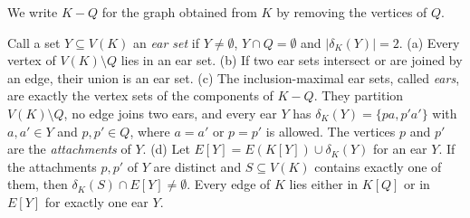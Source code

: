 We write $K - Q$ for the graph obtained from $K$ by removing the vertices of $Q$.

\begin{lemma}[Ears]
\label{lem:zz-ears}
Call a set $Y \subseteq V(K)$ an \emph{ear set} if $Y \neq \emptyset$, $Y \cap Q = \emptyset$ and $|\delta_K(Y)| = 2$.
(a) Every vertex of $V(K) \setminus Q$ lies in an ear set.
(b) If two ear sets intersect or are joined by an edge, their union is an ear set.
(c) The inclusion-maximal ear sets, called \emph{ears}, are exactly the vertex sets of the components of $K - Q$.
They partition $V(K) \setminus Q$, no edge joins two ears, and every ear $Y$ has $\delta_K(Y) = \{pa, p'a'\}$ with $a, a' \in Y$ and $p, p' \in Q$, where $a = a'$ or $p = p'$ is allowed.
The vertices $p$ and $p'$ are the \emph{attachments} of $Y$.
(d) Let $E[Y] = E(K[Y]) \cup \delta_K(Y)$ for an ear $Y$.
If the attachments $p, p'$ of $Y$ are distinct and $S \subseteq V(K)$ contains exactly one of them, then $\delta_K(S) \cap E[Y] \neq \emptyset$.
Every edge of $K$ lies either in $K[Q]$ or in $E[Y]$ for exactly one ear $Y$.
\end{lemma}


